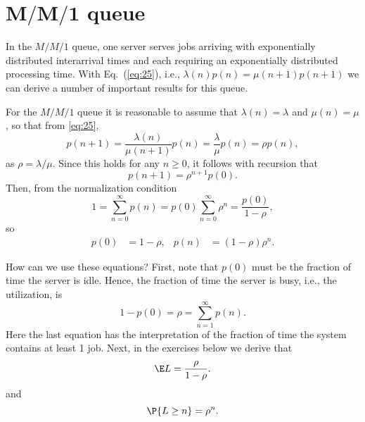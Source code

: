 \section
[$M/M/1$ queue]
{$\mathbf{M/M/1}$ queue}
\label{sec:mm1}

In the $M/M/1$ queue, one server serves jobs arriving with
exponentially distributed interarrival times and each requiring an
exponentially distributed processing time.  With Eq.~(\ref{eq:25}),
i.e., $\lambda(n)p(n)= \mu(n+1)p(n+1)$ we can derive a number of
important results for this queue.

For the $M/M/1$ queue it is reasonable to assume that
$\lambda(n) = \lambda$ and $\mu(n)= \mu$, so that from \eqref{eq:25},
\begin{equation*}
  p(n+1) = \frac{\lambda(n)}{\mu(n+1)} p(n) = \frac{\lambda}{\mu} p(n) = \rho p(n),
\end{equation*}
as $\rho=\lambda/\mu$. Since this holds for any $n\geq 0$, it follows with
recursion that
\begin{equation*}
  p(n+1) = \rho^{n+1} p(0).
\end{equation*}
Then, from the normalization condition
\begin{equation*}
1=  \sum_{n=0}^\infty p(n) = p(0)\sum_{n=0}^\infty \rho^n = \frac{p(0)}{1-\rho},
\end{equation*}
so 
\begin{align}\label{eq:23}
p(0) &=1-\rho, &   p(n) &=  (1-\rho)\rho^{n}.
\end{align}

How can we use these equations? First, note that $p(0)$ must be the
fraction of time the server is idle. Hence, the fraction of time the
server is busy, i.e., the utilization, is
\begin{equation*}
  1-p(0) = \rho = \sum_{n=1}^\infty p(n).
\end{equation*}
Here the last equation has the interpretation of the fraction of time
the system contains at least 1 job. Next, in the exercises below we
derive that
\begin{equation}\label{eq:el}
  \E L = \frac \rho{1-\rho}.
\end{equation}
and 
\begin{equation}\label{eq:pn}
  \P{L\geq n} = \rho^n.
\end{equation}

